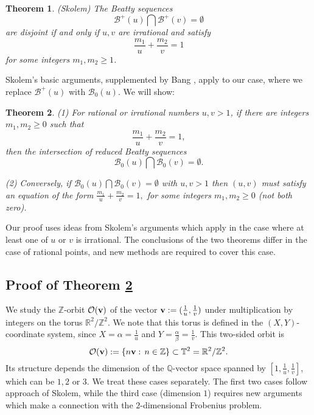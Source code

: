 \documentclass[12pt,letterpaper, reqno]{amsart}
\newtheorem{thm}{Theorem}[section]
\theoremstyle{definition}
\theoremstyle{remark}
\newcommand{\RR}{\ensuremath{\mathbb{R}}}
\newcommand{\ZZ}{\ensuremath{\mathbb{Z}}}
\newcommand{\QQ}{\mathbb{Q}}
\newcommand{\TT}{\mathbb{T}}
\newcommand{\sB}{{\mathcal B}}
\newcommand{\bv}{{\bf v}}
\newcommand{\sO}{{\mathcal O}}
\begin{document}
\begin{thm} \label{thm:47} {\em (Skolem)}
The Beatty sequences 
\[ \sB^{+}(u) \bigcap \sB^{+}(v)= \emptyset \]
are disjoint
 if and only if $u,v$ are irrational and satisfy 
\[
 \frac{m_1}{u} + \frac{m_2}{v} =1
 \]
for some integers $m_1, m_2 \ge 1$.
\end{thm}
 
Skolem's basic arguments, supplemented by Bang \cite[Sect. 5]{Ban57}, apply to
our case, where we replace $\sB^{+}(u)$ with $\sB_0(u)$. We will show:
 
\begin{thm} \label{thm:49a} 
 (1) For rational or irrational numbers $u, v>1$, 
 if there are integers $m_1, m_2 \ge 0$ such that
 $$
 \frac{m_1}{u} + \frac{m_2}{v} =1,
 $$
then the intersection of reduced Beatty sequences 
$$\sB_0(u) \bigcap \sB_0(v)= \emptyset.$$

(2) Conversely, if $\sB_0(u) \bigcap \sB_0(v)= \emptyset$ with $u, v>1$ 
  then $(u, v)$ must
satisfy an equation of the  form 
$ \frac{m_1}{u} + \frac{m_2}{v} =1,$
for some integers $m_1,m_2 \ge 0$ (not both zero).  
 \end{thm}

Our proof uses ideas from Skolem's arguments which apply
in the case where at least one of   $u$ or $v$ is irrational.  The conclusions of
the two theorems differ in the case of rational points, and new methods 
are required to cover this case. 

%
%
\subsection{Proof of Theorem \ref{thm:49a} }\label{sec:44}

We study the $\ZZ$-orbit $\sO(\bv)$
of the vector $\bv := (\frac{1}{u}, \frac{1}{v})$ under multiplication
by integers on the 
torus $\RR^2/\ZZ^2$. We note that this torus is defined in  the $(X, Y)$-coordinate system, since
$X = \alpha = \frac{1}{u}$ and $Y= \frac{\alpha}{\beta} = \frac{1}{v}$.
This two-sided orbit  is
$$
\sO(\bv) := \{ n \bv: \, n \in \ZZ\} \subset \TT^2= \RR^2 / \ZZ^2.
$$
Its 
structure depends the dimension of
the $\QQ$-vector space spanned by $[1, \frac{1}{u}, \frac{1}{v}]$,
which can be $1, 2$ or $3$.
We treat these cases separately. The first two cases follow approach  of Skolem,
 while the third case (dimension $1$) requires new arguments which make
 a  connection with
 the $2$-dimensional Frobenius problem.
\end{document}
